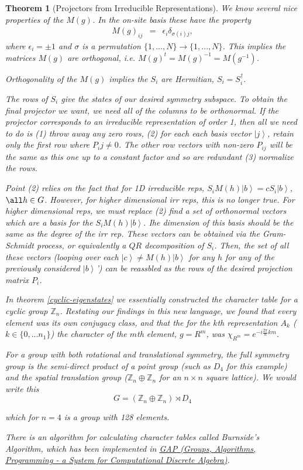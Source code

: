 \documentclass{article}
\newcommand{\ket}[1]{\left| #1 \right>} %
\newtheorem{theorem}{Theorem}[section]
\theoremstyle{definition}
\begin{document}
\begin{theorem}[Projectors from Irreducible Representations]
We know several nice properties of the $M(g)$. In the on-site basis these have the property
\begin{eqnarray}
M(g)_{ij} &=& \epsilon_i \delta_{\sigma(i) j},
\end{eqnarray}
where $\epsilon_i = \pm 1$ and $\sigma$ is a permutation $\{1, ..., N\} \to \{1, ..., N\}$. This implies the matrices $M(g)$ are orthogonal, i.e. $M(g)^t = M(g)^{-1} = M(g^{-1})$.

Orthogonality of the $M(g)$ implies the $S_i$ are Hermitian, $S_i = S_i^\dag$.

The rows of $S_i$ give the states of our desired symmetry subspace. To obtain the final projector we want, we need all of the columns to be orthonormal. If the projector corresponds to an irreducible representation of order 1, then all we need to do is (1) throw away any zero rows, (2) for each each basis vector $\ket{j}$, retain only the first row where $P_ij \neq 0$. The other row vectors with non-zero $P_{ij}$ will be the same as this one up to a constant factor and so are redundant (3) normalize the rows.

Point (2) relies on the fact that for 1D irreducible reps, $S_i M(h) \ket{b} = c S_i \ket{b}$, $\all h \in G$. However, for higher dimensional irr reps, this is no longer true. For higher dimensional reps, we must replace (2) find a set of orthonormal vectors which are a basis for the $S_i M(h) \ket{b}$. Ihe dimension of this basis should be the same as the degree of the irr rep. These vectors can be obtained via the Gram-Schmidt process, or equivalently a $QR$ decomposition of $S_i$. Then, the set of all these vectors (looping over each $\ket{c} \neq M(h) \ket{b}$ for any $h$ for any of the previously considered $\ket{b}$') can be reassbled as the rows of the desired projection matrix $P_i$.

In theorem \ref{cyclic-eigenstates} we essentially constructed the character table for a cyclic group $\mathbb{Z}_n$. Restating our findings in this new language, we found that every element was its own conjugacy class, and that the for the $k$th representation $A_k$ ($k \in \{0,...n_1\}$) the character of the $m$th element, $g = R^m$, was $\chi_{R^m} = e^{-i \frac{2\pi}{n} km}$.

For a group with both rotational and translational symmetry, the full symmetry group is the semi-direct product of a point group (such as $D_4$ for this example) and the spatial translation group ($\mathbb{Z}_n \oplus \mathbb{Z}_n$ for an $n \times n$ square lattice). We would write this 
\begin{equation}
G = (\mathbb{Z}_n \oplus \mathbb{Z}_n) \rtimes D_4
\end{equation}

which for $n=4$ is a group with 128 elements.

There is an algorithm for calculating character tables called \emph{Burnside's Algorithm}, which has been implemented in \href{https://www.gap-system.org/}{GAP (Groups, Algorithms, Programming - a System for Computational Discrete Algebra)}.

\end{theorem}
\end{document}

